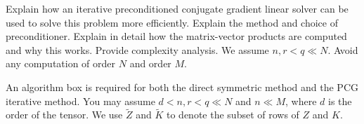 Explain how an iterative preconditioned conjugate gradient linear solver can be used to solve this problem more efficiently. Explain the method and choice of preconditioner. Explain in detail how the matrix-vector products are computed and why this works. Provide complexity analysis. We assume $n, r < q \ll N$. Avoid any computation of order $N$ and order $M$.

An algorithm box is required for both the direct symmetric method and the PCG iterative method. You may assume $d < n, r < q \ll N$ and $n\ll M$, where $d$ is the order of the tensor.
We use $\tilde{Z}$ and $\tilde{K}$ to denote the subset of rows of $Z$ and $K$. 

